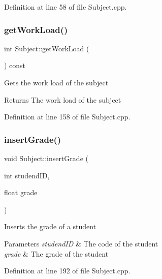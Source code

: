 Definition at line 58 of file Subject.\+cpp.

\mbox{\label{classSubject_a628fc24fd443deb1ab62e4dc05e8ec25}} 
\subsubsection{\texorpdfstring{get\+Work\+Load()}{getWorkLoad()}}
{\footnotesize\ttfamily int Subject\+::get\+Work\+Load (\begin{DoxyParamCaption}{ }\end{DoxyParamCaption}) const}

Gets the work load of the subject \begin{DoxyReturn}{Returns}
The work load of the subject 
\end{DoxyReturn}


Definition at line 158 of file Subject.\+cpp.

\mbox{\label{classSubject_ae0571c4d3b1b46c48dc4bc540d450294}} 
\subsubsection{\texorpdfstring{insert\+Grade()}{insertGrade()}}
{\footnotesize\ttfamily void Subject\+::insert\+Grade (\begin{DoxyParamCaption}\item[{int}]{studend\+ID,  }\item[{float}]{grade }\end{DoxyParamCaption})}

Inserts the grade of a student 
\begin{DoxyParams}{Parameters}
{\em studend\+ID} & The code of the student \\
\hline
{\em grade} & The grade of the student \\
\hline
\end{DoxyParams}


Definition at line 192 of file Subject.\+cpp.

\mbox{\label{classSubject_a2ba88df904eeb87b136764898ea3a1fc}} 
